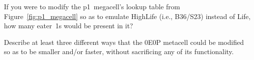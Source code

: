 \begin{multicols}{2}
	
	\begin{problem}\label{exer:modify_p1_megacell_rule} 
		If you were to modify the p1~megacell's lookup table from Figure~\ref{fig:p1_megacell} so as to emulate HighLife (i.e., B36/S23) instead of Life, how many eater~1s would be present in it?
	\end{problem}


	\mfilbreak
	
	
	\begin{problem}\label{exer:0e0p_how_make_faster} 
		Describe at least three different ways that the 0E0P metacell could be modified so as to be smaller and/or faster, without sacrificing any of its functionality.
	\end{problem}
	
	
\end{multicols}
\normalsize\vspace*{0.01cm}\ifdefined\FORPRINTING{}\else%
\fi
